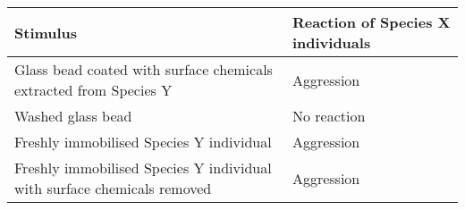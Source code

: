 \begin{center}
		\begin{tabular}{|p{5cm}|p{4cm}|}
			\hline
			\textbf{Stimulus} & \textbf{Reaction of Species X individuals} \\
			\hline
			Glass bead coated with surface chemicals extracted from Species Y & Aggression \\
			\hline
			Washed glass bead & No reaction \\
			\hline
			Freshly immobilised Species Y individual & Aggression \\
			\hline
			Freshly immobilised Species Y individual with surface chemicals removed & Aggression \\
			\hline
		\end{tabular}
\end{center}        